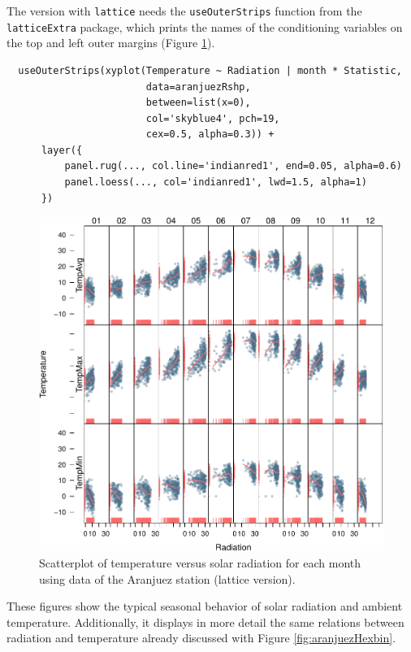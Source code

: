 \documentclass[smallroyalvopaper]{memoir}
\begin{document}
The version with \texttt{lattice} needs the \texttt{useOuterStrips} function from
the \texttt{latticeExtra} package, which prints the names of the conditioning
variables on the top and left outer margins (Figure
 \ref{fig:aranjuezOuterStrips}).


\lstset{language=r,label= ,caption= ,captionpos=b,numbers=none}
\begin{lstlisting}
  useOuterStrips(xyplot(Temperature ~ Radiation | month * Statistic,
                        data=aranjuezRshp,
                        between=list(x=0),
                        col='skyblue4', pch=19,
                        cex=0.5, alpha=0.3)) +
      layer({
          panel.rug(..., col.line='indianred1', end=0.05, alpha=0.6)
          panel.loess(..., col='indianred1', lwd=1.5, alpha=1)
      })
\end{lstlisting}

\begin{figure}[htbp]
\centering
\includegraphics[width=.9\linewidth]{figs/aranjuezOuterStrips.pdf}
\caption{Scatterplot of temperature versus solar radiation for each month using data of the Aranjuez station (lattice version). \label{fig:aranjuezOuterStrips}}
\end{figure}

These figures show the typical seasonal behavior of solar radiation
and ambient temperature. Additionally, it displays in more detail the
same relations between radiation and temperature already discussed
with Figure \ref{fig:aranjuezHexbin}.
\end{document}
